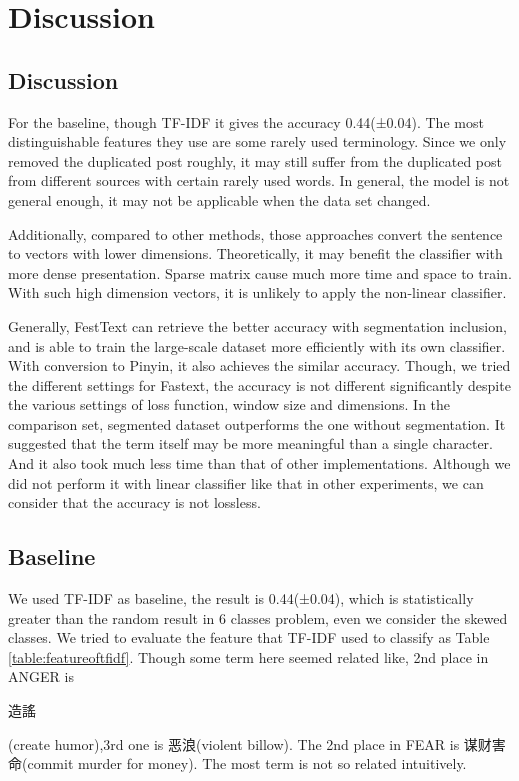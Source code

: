 \chapter{Discussion}


\section{Discussion}


For the baseline, though TF-IDF it gives the accuracy 0.44(±0.04). 
The most distinguishable features they use are some rarely used terminology. 
Since we only removed the duplicated post roughly, it may still suffer from the duplicated post from different sources with certain rarely used words. 
In general, the model is not general enough, it may not be applicable when the data set changed. 

Additionally, compared to other methods, those approaches convert the sentence to vectors with lower dimensions.
Theoretically, it may benefit the classifier with more dense presentation. Sparse matrix cause much more time and space to train.
With such high dimension vectors, it is unlikely to apply the non-linear classifier.

Generally, FestText can retrieve the better accuracy with segmentation inclusion, and is able to train the large-scale dataset more efficiently with its own classifier.
With conversion to Pinyin, it also achieves the similar accuracy. Though, we tried the different settings for Fastext,
the accuracy is not different significantly despite the various settings of loss function, window size and dimensions. 
In the comparison set, segmented dataset outperforms the one without segmentation. 
It suggested that the term itself may be more meaningful than a single character. And it also took much less time than that of other implementations.
Although we did not perform it with linear classifier like that in other experiments, we can consider that the accuracy is not lossless.

\section{Baseline}

\begin{CJK}{UTF8}{gbsn}
We used TF-IDF as baseline, the result is 0.44(±0.04), which is statistically greater than the random result in 6 classes problem, 
even we consider the skewed classes.  We tried to evaluate the feature that TF-IDF used to classify as Table \ref{table:featureoftfidf}. 
Though some term here seemed related like, 2nd place in ANGER is \begin{CJK}{UTF8}{bkai}造謠\end{CJK} (create humor),3rd one is 恶浪(violent billow). 
The 2nd place in FEAR is 谋财害命(commit murder for money). The most term is not so related intuitively. 
\end{CJK}

